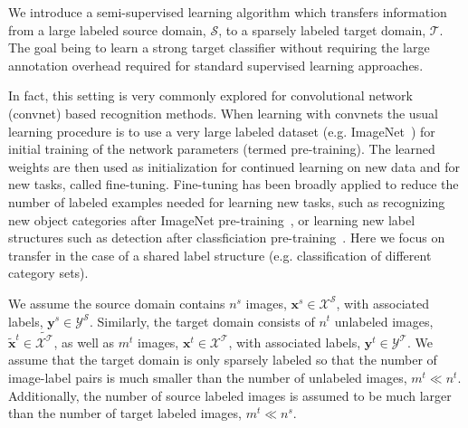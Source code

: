 \newcommand{\domain}{\mathcal{D}}
\newcommand{\src}{\mathcal{S}}
\newcommand{\tgt}{\mathcal{T}}
\newcommand{\img}{\mathbf{x}}
\newcommand{\lbl}{\mathbf{y}}
\newcommand{\rep}{\mathbf{\phi}}
\newcommand{\lossT}{\mathcal{L}}
\newcommand{\lossSup}{\lossT_{\text{sup}}}
\newcommand{\lossDom}{\lossT_{\textit{DT}}}
\newcommand{\lossST}{\lossT_{\textit{ST}}}

\newcommand{\imgSrc}{\img^{s}}
\newcommand{\labelSrc}{\lbl^{s}}
\newcommand{\numSrc}{n^{s}}
\newcommand{\imgTgt}{\img^{t}}
\newcommand{\repSrc}{\rep^{s}}
\newcommand{\repTgt}{\rep^{t}}
\newcommand{\imgTgtU}{\tilde{\img}^{t}}
\newcommand{\labelTgt}{\lbl^{t}}
\newcommand{\numTgt}{n^{t}}
\newcommand{\numTgtU}{n^{t}}
\newcommand{\numTgtL}{m^{t}}



\newcommand{\imgset}{\mathcal{X}}
\newcommand{\imgsetSrc}{\imgset^{\src}}
\newcommand{\imgsetTgt}{\imgset^{\tgt}}
\newcommand{\imgsetTgtU}{\tilde{\imgsetTgt}}
\newcommand{\imgsetTgtL}{\imgsetTgt}


\newcommand{\labelset}{\mathcal{Y}}
\newcommand{\labelsetSrc}{\labelset^{\src}}
\newcommand{\labelsetTgt}{\labelset^{\tgt}}


We introduce a semi-supervised learning algorithm which transfers information from a large labeled source domain, $\src$, to a sparsely labeled target domain, $\tgt$. The goal being to learn a strong target classifier without requiring the large annotation overhead required for standard supervised learning approaches. 

In fact, this setting is very commonly explored for convolutional network (convnet) based recognition methods. When learning with convnets the usual learning procedure is to use a very large labeled dataset (e.g. ImageNet~\cite{imagenet_cvpr09,russakovsky2015imagenet}) for initial training of the network parameters (termed pre-training). The learned weights are then used as initialization for continued learning on new data and for new tasks, called fine-tuning.
Fine-tuning has been broadly applied to reduce the number of labeled examples needed for learning new tasks, such as recognizing new object categories after ImageNet pre-training~\cite{simonyan2014vgg,he2016deep}, or learning new label structures such as detection after classficiation pre-training~\cite{girshick2014rcnn,ren2015faster}. Here we focus on transfer in the case of a shared label structure (e.g. classification of different category sets).

We assume the source domain contains $\numSrc$ images, $\imgSrc \in \imgsetSrc$, with associated labels, $\labelSrc \in  \labelsetSrc$. Similarly, the target domain consists of $\numTgtU$ unlabeled images, $\imgTgtU \in \imgsetTgtU$, as well as $\numTgtL$ images, $\imgTgt \in \imgsetTgtL$, with associated labels, $\labelTgt \in \labelsetTgt$. We assume that the target domain is only sparsely labeled so that the number of image-label pairs is much smaller than the number of unlabeled images, $\numTgtL \ll \numTgtU$.  Additionally, the number of source labeled images is assumed to be much larger than the number of target labeled images, $\numTgtL \ll \numSrc$.

